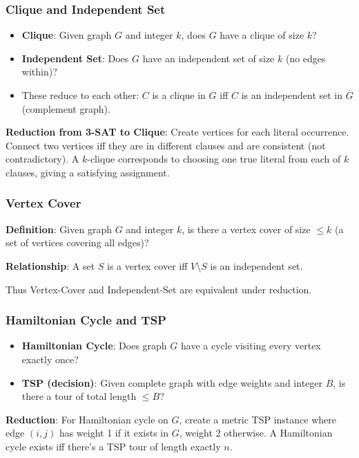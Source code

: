\documentclass[11pt]{article}
\begin{document}
{{{\subsubsection*{Clique and Independent Set}
\begin{itemize}
\item \textbf{Clique}: Given graph $G$ and integer $k$, does $G$ have a clique of size $k$?
\item \textbf{Independent Set}: Does $G$ have an independent set of size $k$ (no edges within)?
\item These reduce to each other: $C$ is a clique in $G$ iff $C$ is an independent set in $\overline{G}$ (complement graph).
\end{itemize}

\textbf{Reduction from 3-SAT to Clique}:
Create vertices for each literal occurrence. Connect two vertices iff they are in different clauses and are consistent (not contradictory). A $k$-clique corresponds to choosing one true literal from each of $k$ clauses, giving a satisfying assignment.

\subsubsection*{Vertex Cover}
\textbf{Definition}: Given graph $G$ and integer $k$, is there a vertex cover of size $\le k$ (a set of vertices covering all edges)?

\textbf{Relationship}: A set $S$ is a vertex cover iff $V \setminus S$ is an independent set.

Thus Vertex-Cover and Independent-Set are equivalent under reduction.

\subsubsection*{Hamiltonian Cycle and TSP}
\begin{itemize}
\item \textbf{Hamiltonian Cycle}: Does graph $G$ have a cycle visiting every vertex exactly once?
\item \textbf{TSP (decision)}: Given complete graph with edge weights and integer $B$, is there a tour of total length $\le B$?
\end{itemize}

\textbf{Reduction}: For Hamiltonian cycle on $G$, create a metric TSP instance where edge $(i,j)$ has weight 1 if it exists in $G$, weight 2 otherwise. A Hamiltonian cycle exists iff there's a TSP tour of length exactly $n$.

}}}
\end{document}
